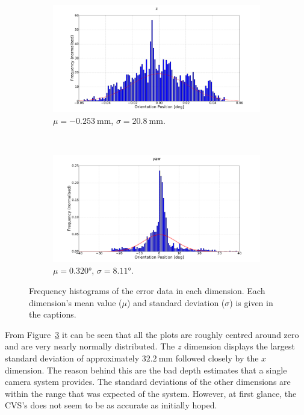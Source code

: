 \begin{figure}
  \begin{subfigure}{0.48\textwidth}
     \includegraphics[clip, trim = 120 0 120 0, width=\textwidth]{figures/chapter3/norm_z}
     \caption{$\mu = \SI{-0.253}{\mm}$, $\sigma = \SI{20.8}{\mm}$.}
  \label{fig:norm-z}
  \end{subfigure}
~
\begin{subfigure}{0.48\textwidth}
     \includegraphics[clip, trim = 120 0 120 0, width=\textwidth]{figures/chapter3/norm_yaw}
     \caption{$\mu = \ang{0.320}$, $\sigma = \ang{8.11}$. }
  \label{fig:norm-yaw}
  \end{subfigure}
  \caption[Frequency histograms of the error data in each dimension.]{Frequency histograms of the error data in each dimension. Each dimension's mean value ($\mu$) and standard deviation ($\sigma$) is given in the captions. }
  \label{fig:err-norm}
\end{figure}

From Figure~\ref{fig:err-norm} it can be seen that all the plots are roughly centred around zero and are very nearly normally distributed. The $z$ dimension displays the largest standard deviation of approximately $\SI{32.2}{\mm}$ followed closely by the $x$ dimension. The reason behind this are the bad depth estimates that a single camera system provides. The standard deviations of the other dimensions are within the range that was expected of the system. However, at first glance, the CVS's does not seem to be as accurate as initially hoped. 


